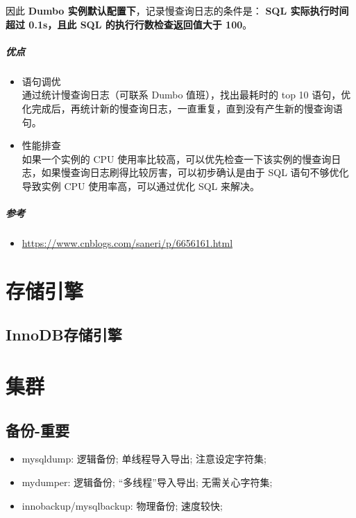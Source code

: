 \documentclass[UTF8,a4paper,12pt]{ctexbook}
\begin{document}
			
			因此 \textbf{Dumbo 实例默认配置下}，记录慢查询日志的条件是：
			\textbf{SQL 实际执行时间超过 0.1s，且此 SQL 的执行行数检查返回值大于 100}。
		\paragraph{优点}
			\begin{itemize}
				\item 语句调优 \\ 通过统计慢查询日志（可联系 Dumbo 值班），找出最耗时的 top 10 语句，优化完成后，再统计新的慢查询日志，一直重复，直到没有产生新的慢查询语句。
				\item 性能排查 \\ 如果一个实例的 CPU 使用率比较高，可以优先检查一下该实例的慢查询日志，如果慢查询日志刷得比较厉害，可以初步确认是由于 SQL 语句不够优化导致实例 CPU 使用率高，可以通过优化 SQL 来解决。
			\end{itemize}
		
		\paragraph{参考}
			\begin{itemize}
				\item \url{https://www.cnblogs.com/saneri/p/6656161.html}
			\end{itemize}
				


\chapter{存储引擎}
	\section{InnoDB存储引擎}	
	
	
\chapter{集群} 
	\section{备份-重要}
		\begin{itemize}
			\item mysqldump: 逻辑备份; 单线程导入导出; 注意设定字符集; 
			\item mydumper: 逻辑备份; “多线程”导入导出; 无需关心字符集;
			\item innobackup/mysqlbackup: 物理备份; 速度较快;
		\end{itemize}
\end{document}
